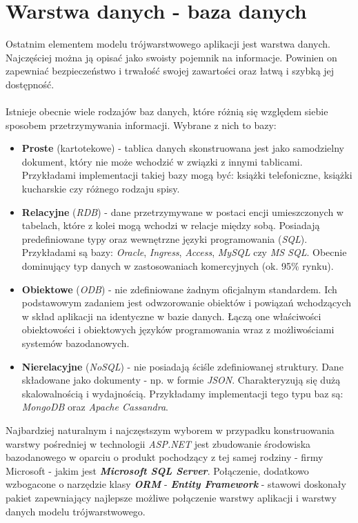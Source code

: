 \section{Warstwa danych - baza danych}
\quad Ostatnim elementem modelu trójwarstwowego aplikacji jest warstwa danych.
    Najczęściej można ją opisać jako swoisty pojemnik na informacje. Powinien on zapewniać bezpieczeństwo i trwałość swojej zawartości oraz łatwą i szybką jej dostępność. \\
    \\
    Istnieje obecnie wiele rodzajów baz danych, które różnią się względem siebie sposobem przetrzymywania informacji. Wybrane z nich to bazy:
    \begin{itemize}
        \item \textbf{Proste} (kartotekowe) - tablica danych skonstruowana jest jako samodzielny dokument, który nie może wchodzić w związki z innymi tablicami. Przykładami implementacji takiej bazy mogą być: książki telefoniczne, książki kucharskie czy różnego rodzaju spisy.
        \item \textbf{Relacyjne} (\textit{RDB}) - dane przetrzymywane w postaci encji umieszczonych w tabelach, które z kolei mogą wchodzi w relacje między sobą. Posiadają predefiniowane typy oraz wewnętrzne języki programowania (\textit{SQL}). Przykładami są bazy: \textit{Oracle}, \textit{Ingress}, \textit{Access}, \textit{\textit{MySQL}} czy \textit{MS SQL}. Obecnie dominujący typ danych w zastosowaniach komercyjnych (ok. 95\% rynku).
        \item \textbf{Obiektowe} (\textit{ODB}) - nie zdefiniowane żadnym oficjalnym standardem. Ich podstawowym zadaniem jest odwzorowanie obiektów i powiązań wchodzących w skład aplikacji na identyczne w bazie danych. Łączą one właściwości obiektowości i obiektowych języków programowania wraz z możliwościami systemów bazodanowych.
        \item \textbf{Nierelacyjne} (\textit{NoSQL}) - nie posiadają ściśle zdefiniowanej struktury. Dane składowane jako dokumenty - np. w formie \textit{JSON}. Charakteryzują się dużą skalowalnością i wydajnością. Przykładamy implementacji tego typu baz są: \textit{MongoDB} oraz \textit{Apache Cassandra}.
    \end{itemize}
    Najbardziej naturalnym i najczęstszym wyborem w przypadku konstruowania warstwy pośredniej w technologii \textit{ASP.NET} jest zbudowanie środowiska bazodanowego w oparciu o produkt pochodzący z tej samej rodziny - firmy Microsoft - jakim jest \textbf{\textit{Microsoft SQL Server}}. Połączenie, dodatkowo wzbogacone o narzędzie klasy \textbf{\textit{ORM}} - \textit{\textbf{Entity Framework}} - stawowi doskonały pakiet zapewniający najlepsze możliwe połączenie warstwy aplikacji i warstwy danych modelu trójwarstwowego.\\
